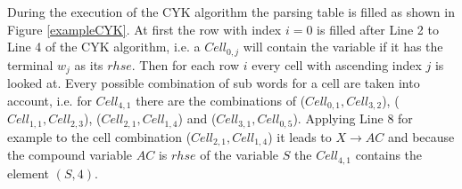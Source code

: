 \noindent {}
During the execution of the CYK algorithm the parsing table is filled as shown in Figure \ref{exampleCYK}. At first the row with index $i=0$ is filled after Line 2 to Line 4 of the CYK algorithm, i.e. a $Cell_{0,j}$ will contain the variable if it has the terminal $w_j$ as its $rhse$. Then for each row $i$ every cell with ascending index $j$ is looked at. Every possible combination of sub words for a cell are taken into account, i.e. for $Cell_{4,1}$ there are the combinations of ($Cell_{0,1},Cell_{3,2}$), ($Cell_{1,1},Cell_{2,3}$), ($Cell_{2,1},Cell_{1,4}$) and ($Cell_{3,1},Cell_{0,5}$). Applying Line 8 for example to the cell combination ($Cell_{2,1},Cell_{1,4}$) it leads to $X\rightarrow AC$ and because the compound variable $AC$ is $rhse$ of the variable $S$ the $Cell_{4,1}$ contains the element $(S,4)$.
\noindent

